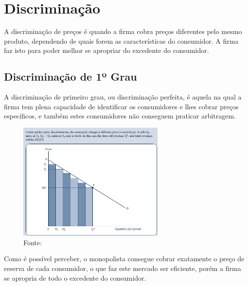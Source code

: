 \documentclass[12pt,a4paper,oneside,brazil]{abntex2}
\begin{document}
\section{Discriminação}
A discriminação de preços é quando a firma cobra preços diferentes pelo mesmo produto, dependendo de quais forem as características do consumidor. A firma faz isto para poder melhor se apropriar do excedente do consumidor.
\subsection{Discriminação de 1º Grau}
A discriminação de primeiro grau, ou discriminação perfeita, é aquela na qual a firma tem plena capacidade de identificar os consumidores e lhes cobrar preços específicos, e também estes consumidores não conseguem praticar arbitragem.

\begin{figure}
	\includegraphics[width=0.65\textwidth]{Discriminação perfeita.png}
	\centering
	\caption{Fonte: \cite[p. 514]{nicholson}}
\end{figure}

Como é possível perceber, o monopolista consegue cobrar exatamente o preço de reserva de cada consumidor, o que faz este mercado ser eficiente, porém a firma se apropria de todo o excedente do consumidor.
\clearpage
\end{document}
